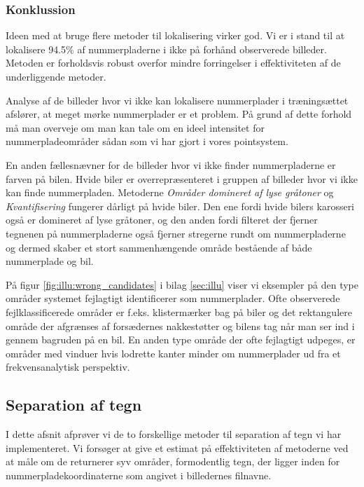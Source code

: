 \subsubsection{Konklussion}
Ideen med at bruge flere metoder til lokalisering virker god. Vi er i stand til at lokalisere 94.5\% af nummerpladerne i ikke på forhånd observerede billeder. Metoden er forholdsvis robust overfor mindre forringelser i effektiviteten af de underliggende metoder.

Analyse af de billeder hvor vi ikke kan lokalisere nummerplader i træningsættet afslører, at meget mørke nummerplader er et problem. På grund af dette forhold må man overveje om man kan tale om en ideel intensitet for nummerpladeområder sådan som vi har gjort i vores pointsystem.

En anden fællesnævner for de billeder hvor vi ikke finder nummerpladerne er farven på bilen. Hvide biler er overrepræsenteret i gruppen af billeder hvor vi ikke kan finde nummerpladen. Metoderne \textit{Områder domineret af lyse gråtoner} og \textit{Kvantifisering} fungerer dårligt på hvide biler. Den ene fordi hvide bilers karosseri også er domineret af lyse gråtoner, og den anden fordi filteret der fjerner tegnenen på nummerpladerne også fjerner stregerne rundt om nummerpladerne og dermed skaber et stort sammenhængende område bestående af både nummerplade og bil. 

På figur \vref{fig:illu:wrong_candidates} i bilag \ref{sec:illu} viser vi eksempler på den type områder systemet fejlagtigt identificerer som nummerplader. Ofte observerede fejlklassificerede områder er f.eks.  klistermærker bag på biler og det rektangulere område der afgrænses af forsædernes nakkestøtter og bilens tag når man ser ind i gennem bagruden på en bil. En anden type område der ofte fejlagtigt udpeges,  er områder med vinduer hvis lodrette kanter minder om nummerplader ud fra et frekvensanalytisk perspektiv.  



\subsection{Separation af tegn}
I dette afsnit afprøver vi de to forskellige metoder til separation af tegn vi har implementeret. Vi forsøger at give et estimat på effektiviteten af metoderne ved at måle om de returnerer syv områder, formodentlig tegn, der ligger inden for nummerpladekoordinaterne som angivet i billedernes filnavne. 

